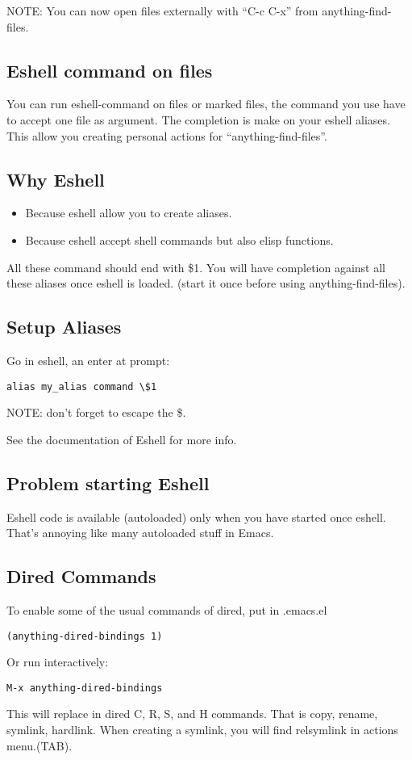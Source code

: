 \documentclass[a4paper,11pt]{article}
\begin{document}
NOTE: You can now open files externally with ``C-c C-x'' from anything-find-files.

\subsection{Eshell command on files}
\label{sec:eshell-command-files}
You can run eshell-command on files or marked files, the command you use have to accept
one file as argument.
The completion is make on your eshell aliases.
This allow you creating personal actions for ``anything-find-files''.

\subsection{Why Eshell}
\label{sec:why-eshell}
\begin{itemize}
\item Because eshell allow you to create aliases.
\end{itemize}
\begin{itemize}
\item Because eshell accept shell commands but also elisp functions.
\end{itemize}
All these command should end with \$1.
You will have completion against all these aliases once eshell is loaded.
(start it once before using anything-find-files).

\subsection{Setup Aliases}
\label{sec:setup-aliases}
Go in eshell, an enter at prompt:
\begin{verbatim}
alias my_alias command \$1
\end{verbatim}
NOTE: don't forget to escape the \$.

See the documentation of Eshell for more info.

\subsection{Problem starting Eshell}
\label{sec:probl-start-eshell}
Eshell code is available (autoloaded) only when you have started once eshell.
That's annoying like many autoloaded stuff in Emacs.
 
\subsection{Dired Commands}
\label{sec:dired-commands}
To enable some of the usual commands of dired, put in .emacs.el
\begin{verbatim}
(anything-dired-bindings 1)
\end{verbatim}
Or run interactively:
\begin{verbatim}
M-x anything-dired-bindings
\end{verbatim}
This will replace in dired C, R, S, and H commands.
That is copy, rename, symlink, hardlink.
When creating a symlink, you will find relsymlink in actions menu.(TAB).
\end{document}

